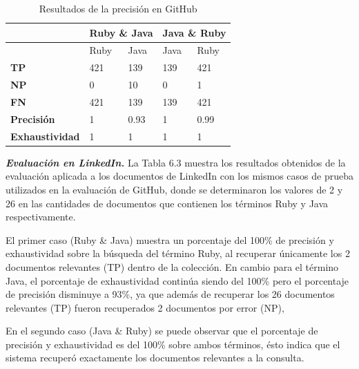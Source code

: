 \begin{center}
\begin{table}[H] 
\centering
\begin{tabular}{|p{3cm} p{2cm} p{2cm} p{2cm} p{2cm}|}
\hline
& \multicolumn{2}{c}{\textbf{Ruby \& Java}} & \multicolumn{2}{c|}{\textbf{Java \& Ruby}} \\ \hline
 & Ruby & Java & Java & Ruby \\
\hline \hline 
\textbf{TP} & 421 & 139 & 139 & 421 \\ \hline
\textbf{NP} & 0 & 10  & 0 & 1 \\ \hline
\textbf{FN} & 421 & 139  & 139 & 421 \\ \hline
\textbf{Precisión} & 1 & 0.93 & 1 & 0.99\\ \hline
\textbf{Exhaustividad} & 1 & 1  & 1 & 1 \\ \hline
\end{tabular}
\caption{Resultados de la precisión en GitHub}
\label{tabla:Tabla de Resultados}
\end{table}
\end{center}

\textit{\textbf{Evaluación en LinkedIn.}} La Tabla 6.3 muestra los resultados obtenidos de la evaluación aplicada a los documentos de LinkedIn con los mismos casos de prueba utilizados en la evaluación de GitHub, donde se determinaron los valores de 2 y 26 en las cantidades de documentos que contienen los términos Ruby y Java respectivamente.

El primer caso (Ruby \& Java) muestra un porcentaje del 100\% de precisión y exhaustividad sobre la búsqueda del término Ruby, al recuperar únicamente los 2 documentos relevantes (TP) dentro de la colección. En cambio para el término Java, el porcentaje de exhaustividad continúa siendo del 100\% pero el porcentaje de precisión disminuye a 93\%, ya que además de recuperar los 26 documentos relevantes (TP) fueron recuperados 2 documentos por error (NP), 

En el segundo caso (Java \& Ruby) se puede observar que el porcentaje de precisión y exhaustividad es del 100\% sobre ambos términos, ésto indica que el sistema recuperó exactamente los documentos relevantes a la consulta.

